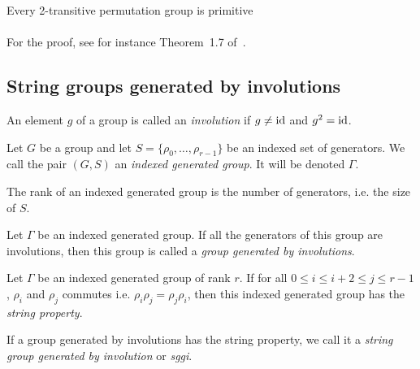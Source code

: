 \begin{property}
  \label{2-transitive-primitive}
  Every 2-transitive permutation group is primitive
\end{property}

\paragraph{}
For the proof, see for instance Theorem~1.7 of~\cite{cameronPermutationGroups}.

\subsection{String groups generated by involutions}

\begin{definition}[Involution]
  An element $g$ of a group is called an \textit{involution} if $g \neq \operatorname{id}$ and $g^2 = \operatorname{id}$.
\end{definition}

\begin{definition}
  Let $G$ be a group and let $S = \{\rho_0, \dots, \rho_{r-1}\}$ be an indexed set of generators.
  We call the pair $(G,S)$ an \textit{indexed generated group}. It will be denoted $\Gamma$.
\end{definition}

\begin{definition}
  The rank of an indexed generated group is the number of generators, i.e. the size of $S$.
\end{definition}

\begin{definition}
  Let $\Gamma$ be an indexed generated group. If all the generators of this group are involutions, then this group is called a \textit{group generated by involutions}.
\end{definition}

\begin{definition}
  Let $\Gamma$ be an indexed generated group of rank $r$. If for all $0 \le i \le i + 2 \le j \le r-1$, $\rho_i$ and $\rho_j$ commutes i.e. $\rho_i \rho_j = \rho_j\rho_i$, then this indexed generated group has the \textit{string property}.
\end{definition}

\begin{definition}
  If a group generated by involutions has the string property, we call it a \textit{string group generated by involution} or \textit{sggi}.
\end{definition}

